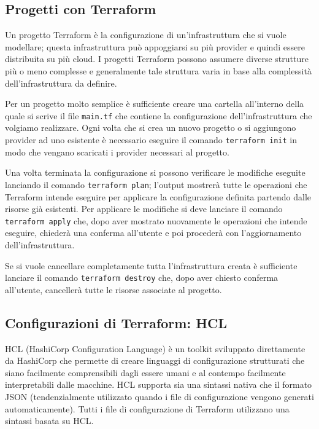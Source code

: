 \subsection{Progetti con Terraform}

Un progetto Terraform è la configurazione di un'infrastruttura che si vuole modellare; questa infrastruttura può appoggiarsi su più provider e quindi essere distribuita su più cloud. I progetti Terraform possono assumere diverse strutture più o meno complesse e generalmente tale struttura varia in base alla complessità dell'infrastruttura da definire.

Per un progetto molto semplice è sufficiente creare una cartella all'interno della quale si scrive il file \verb|main.tf| che contiene la configurazione dell'infrastruttura che volgiamo realizzare. Ogni volta che si crea un nuovo progetto o si aggiungono provider ad uno esistente è necessario eseguire il comando \verb|terraform init| in modo che vengano scaricati i provider necessari al progetto.

Una volta terminata la configurazione si possono verificare le modifiche eseguite lanciando il comando \verb|terraform plan|; l'output mostrerà tutte le operazioni che Terraform intende eseguire per applicare la configurazione definita partendo dalle risorse già esistenti. Per applicare le modifiche si deve lanciare il comando \verb|terraform apply| che, dopo aver mostrato nuovamente le operazioni che intende eseguire, chiederà una conferma all'utente e poi procederà con l'aggiornamento dell'infrastruttura.

Se si vuole cancellare completamente tutta l'infrastruttura creata è sufficiente lanciare il comando \verb|terraform destroy| che, dopo aver chiesto conferma all'utente, cancellerà tutte le risorse associate al progetto.

\subsection{Configurazioni di Terraform: HCL}

HCL (HashiCorp Configuration Language) è un toolkit sviluppato direttamente da HashiCorp che permette di creare linguaggi di configurazione strutturati che siano facilmente comprensibili dagli essere umani e al contempo facilmente interpretabili dalle macchine. HCL supporta sia una sintassi nativa che il formato JSON (tendenzialmente utilizzato quando i file di configurazione vengono generati automaticamente). Tutti i file di configurazione di Terraform utilizzano una sintassi basata su HCL.

